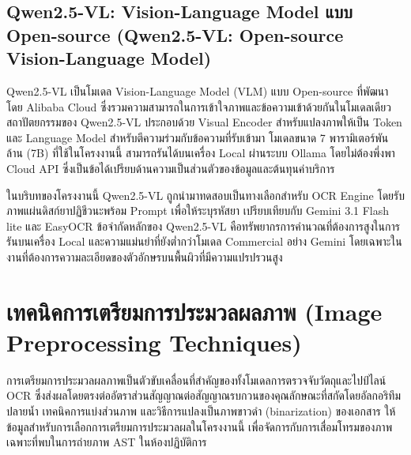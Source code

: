 \subsection{Qwen2.5-VL: Vision-Language Model แบบ Open-source (Qwen2.5-VL: Open-source Vision-Language Model)}

Qwen2.5-VL \cite{qwen2025vl} เป็นโมเดล Vision-Language Model (VLM) แบบ Open-source ที่พัฒนาโดย Alibaba Cloud ซึ่งรวมความสามารถในการเข้าใจภาพและข้อความเข้าด้วยกันในโมเดลเดียว สถาปัตยกรรมของ Qwen2.5-VL ประกอบด้วย Visual Encoder สำหรับแปลงภาพให้เป็น Token และ Language Model สำหรับตีความร่วมกับข้อความที่รับเข้ามา โมเดลขนาด 7 พารามิเตอร์พันล้าน (7B) ที่ใช้ในโครงงานนี้ สามารถรันได้บนเครื่อง Local ผ่านระบบ Ollama โดยไม่ต้องพึ่งพา Cloud API ซึ่งเป็นข้อได้เปรียบด้านความเป็นส่วนตัวของข้อมูลและต้นทุนค่าบริการ

ในบริบทของโครงงานนี้ Qwen2.5-VL ถูกนำมาทดสอบเป็นทางเลือกสำหรับ OCR Engine โดยรับภาพแผ่นดิสก์ยาปฏิชีวนะพร้อม Prompt เพื่อให้ระบุรหัสยา เปรียบเทียบกับ Gemini 3.1 Flash lite และ EasyOCR ข้อจำกัดหลักของ Qwen2.5-VL คือทรัพยากรการคำนวณที่ต้องการสูงในการรันบนเครื่อง Local และความแม่นยำที่ยังต่ำกว่าโมเดล Commercial อย่าง Gemini โดยเฉพาะในงานที่ต้องการความละเอียดของตัวอักษรบนพื้นผิวที่มีความแปรปรวนสูง
\section{เทคนิคการเตรียมการประมวลผลภาพ (Image Preprocessing Techniques)}

การเตรียมการประมวลผลภาพเป็นตัวขับเคลื่อนที่สำคัญของทั้งโมเดลการตรวจจับวัตถุและไปป์ไลน์ OCR ซึ่งส่งผลโดยตรงต่ออัตราส่วนสัญญาณต่อสัญญาณรบกวนของคุณลักษณะที่สกัดโดยอัลกอริทึมปลายน้ำ \cite{qi2021image_enhancement} เทคนิคการแบ่งส่วนภาพ \cite{jasim2021segmentation,dhanachandra2015} และวิธีการแปลงเป็นภาพขาวดำ (binarization) ของเอกสาร \cite{yang2024binarization} ให้ข้อมูลสำหรับการเลือกการเตรียมการประมวลผลในโครงงานนี้ เพื่อจัดการกับการเสื่อมโทรมของภาพเฉพาะที่พบในการถ่ายภาพ AST ในห้องปฏิบัติการ

